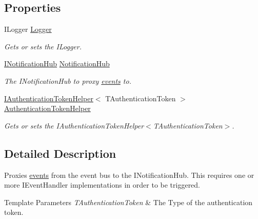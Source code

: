 \subsection*{Properties}
\begin{DoxyCompactItemize}
\item 
I\+Logger \hyperlink{classCqrs_1_1WebApi_1_1Events_1_1Handlers_1_1EventToHubProxy_a120e7cd3ad97d9e6382df657b9c98c4c_a120e7cd3ad97d9e6382df657b9c98c4c}{Logger}
\begin{DoxyCompactList}\small\item\em Gets or sets the I\+Logger. \end{DoxyCompactList}\item 
\hyperlink{interfaceCqrs_1_1WebApi_1_1SignalR_1_1Hubs_1_1INotificationHub}{I\+Notification\+Hub} \hyperlink{classCqrs_1_1WebApi_1_1Events_1_1Handlers_1_1EventToHubProxy_a3e27dc5fb1315bc8200487fbf9b3b47f_a3e27dc5fb1315bc8200487fbf9b3b47f}{Notification\+Hub}
\begin{DoxyCompactList}\small\item\em The I\+Notification\+Hub to proxy \hyperlink{}{events} to. \end{DoxyCompactList}\item 
\hyperlink{interfaceCqrs_1_1Authentication_1_1IAuthenticationTokenHelper}{I\+Authentication\+Token\+Helper}$<$ T\+Authentication\+Token $>$ \hyperlink{classCqrs_1_1WebApi_1_1Events_1_1Handlers_1_1EventToHubProxy_af5593d8e6bace37fa52545c1f8e65e32_af5593d8e6bace37fa52545c1f8e65e32}{Authentication\+Token\+Helper}
\begin{DoxyCompactList}\small\item\em Gets or sets the I\+Authentication\+Token\+Helper$<$\+T\+Authentication\+Token$>$. \end{DoxyCompactList}\end{DoxyCompactItemize}


\subsection{Detailed Description}
Proxies \hyperlink{}{events} from the event bus to the I\+Notification\+Hub. This requires one or more I\+Event\+Handler implementations in order to be triggered. 


\begin{DoxyTemplParams}{Template Parameters}
{\em T\+Authentication\+Token} & The Type of the authentication token.\\
\hline
\end{DoxyTemplParams}


